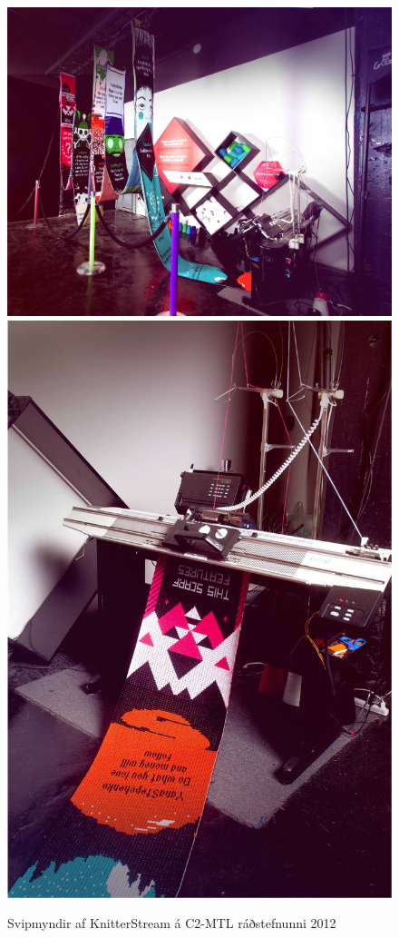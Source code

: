 \documentclass[a4paper,12pt,twoside]{article}
\begin{document}
\begin{figure}[H]
    \centering
    \includegraphics[height=.3\textheight]{myndir/knitterstream_24.jpeg}
    \includegraphics[height=.3\textheight]{myndir/knitterstream_25.jpg}
    \caption{Svipmyndir af KnitterStream á C2-MTL ráðstefnunni 2012}
    \label{fig:knitterstream}
\end{figure}
\end{document}
